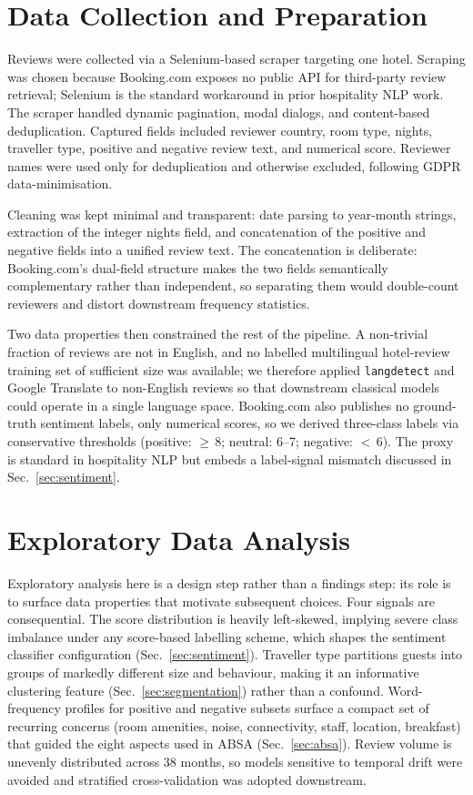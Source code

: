 \documentclass[runningheads]{llncs}
\begin{document}
\section{Data Collection and Preparation}

Reviews were collected via a Selenium-based scraper targeting one hotel.
Scraping was chosen because Booking.com exposes no public API for
third-party review retrieval; Selenium is the standard workaround in prior
hospitality NLP work. The scraper handled dynamic pagination, modal
dialogs, and content-based deduplication. Captured fields included
reviewer country, room type, nights, traveller type, positive and
negative review text, and numerical score. Reviewer names were used only
for deduplication and otherwise excluded, following GDPR
data-minimisation.

Cleaning was kept minimal and transparent: date parsing to year-month
strings, extraction of the integer nights field, and concatenation of the
positive and negative fields into a unified review text. The
concatenation is deliberate: Booking.com's dual-field structure makes the
two fields semantically complementary rather than independent, so
separating them would double-count reviewers and distort downstream
frequency statistics.

Two data properties then constrained the rest of the pipeline. A
non-trivial fraction of reviews are not in English, and no labelled
multilingual hotel-review training set of sufficient size was
available; we therefore applied \texttt{langdetect} and Google Translate
to non-English reviews so that downstream classical models could operate
in a single language space. Booking.com also publishes no ground-truth
sentiment labels, only numerical scores, so we derived three-class
labels via conservative thresholds (positive: ${\geq}\,8$; neutral: 6--7;
negative: ${<}\,6$). The proxy is standard in hospitality NLP but
embeds a label-signal mismatch discussed in Sec.~\ref{sec:sentiment}.

\section{Exploratory Data Analysis}
\label{sec:eda}

Exploratory analysis here is a design step rather than a findings step:
its role is to surface data properties that motivate subsequent choices.
Four signals are consequential. The score distribution is heavily
left-skewed, implying severe class imbalance under any score-based
labelling scheme, which shapes the sentiment classifier configuration
(Sec.~\ref{sec:sentiment}). Traveller type partitions guests into groups
of markedly different size and behaviour, making it an informative
clustering feature (Sec.~\ref{sec:segmentation}) rather than a confound.
Word-frequency profiles for positive and negative subsets surface a
compact set of recurring concerns (room amenities, noise, connectivity,
staff, location, breakfast) that guided the eight aspects used in ABSA
(Sec.~\ref{sec:absa}). Review volume is unevenly distributed across 38
months, so models sensitive to temporal drift were avoided and
stratified cross-validation was adopted downstream.
\end{document}
